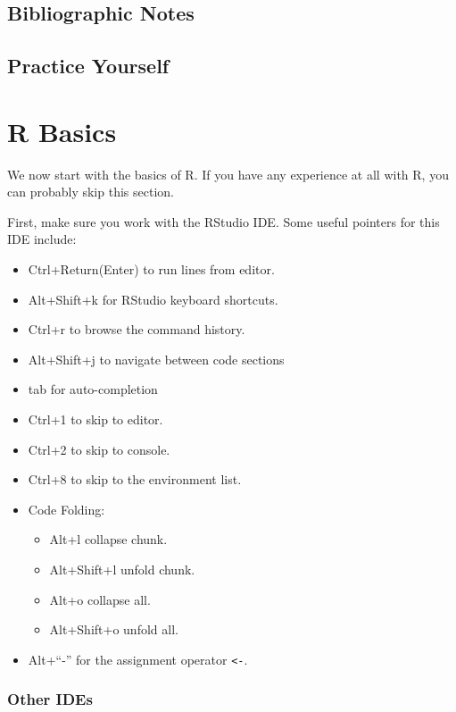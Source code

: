 \documentclass[]{book}
\providecommand{\tightlist}{%
  \setlength{\itemsep}{0pt}\setlength{\parskip}{0pt}}
\theoremstyle{definition}
\theoremstyle{definition}
\theoremstyle{definition}
\theoremstyle{remark}
\begin{document}
\section{Bibliographic Notes}\label{bibliographic-notes}

\section{Practice Yourself}\label{practice-yourself}

\chapter{R Basics}\label{basics}

We now start with the basics of R. If you have any experience at all
with R, you can probably skip this section.

First, make sure you work with the RStudio IDE. Some useful pointers for
this IDE include:

\begin{itemize}
\tightlist
\item
  Ctrl+Return(Enter) to run lines from editor.
\item
  Alt+Shift+k for RStudio keyboard shortcuts.
\item
  Ctrl+r to browse the command history.
\item
  Alt+Shift+j to navigate between code sections
\item
  tab for auto-completion
\item
  Ctrl+1 to skip to editor.
\item
  Ctrl+2 to skip to console.
\item
  Ctrl+8 to skip to the environment list.
\item
  Code Folding:

  \begin{itemize}
  \tightlist
  \item
    Alt+l collapse chunk.
  \item
    Alt+Shift+l unfold chunk.
  \item
    Alt+o collapse all.
  \item
    Alt+Shift+o unfold all.
  \end{itemize}
\item
  Alt+``-'' for the assignment operator \texttt{\textless{}-}.
\end{itemize}

\subsection{Other IDEs}\label{other-ides}
\end{document}
